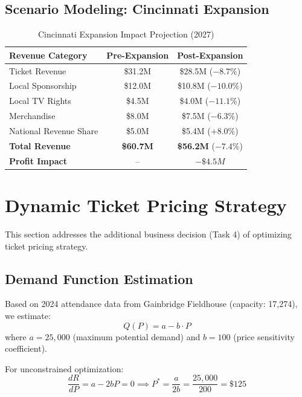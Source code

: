 \documentclass{mcmthesis}
\begin{document}
\subsection{Scenario Modeling: Cincinnati Expansion}

\begin{table}[H]
\centering
\caption{Cincinnati Expansion Impact Projection (2027)}
\begin{tabular}{lcc}
\toprule
\textbf{Revenue Category} & \textbf{Pre-Expansion} & \textbf{Post-Expansion} \\
\midrule
Ticket Revenue & \$31.2M & \$28.5M ($-8.7\%$) \\
Local Sponsorship & \$12.0M & \$10.8M ($-10.0\%$) \\
Local TV Rights & \$4.5M & \$4.0M ($-11.1\%$) \\
Merchandise & \$8.0M & \$7.5M ($-6.3\%$) \\
National Revenue Share & \$5.0M & \$5.4M ($+8.0\%$) \\
\midrule
\textbf{Total Revenue} & \textbf{\$60.7M} & \textbf{\$56.2M} ($-7.4\%$) \\
\textbf{Profit Impact} & -- & \textbf{$-\$4.5M$} \\
\bottomrule
\end{tabular}
\end{table}

\section{Dynamic Ticket Pricing Strategy}

This section addresses the additional business decision (Task 4) of optimizing ticket pricing strategy.

\subsection{Demand Function Estimation}

Based on 2024 attendance data from Gainbridge Fieldhouse (capacity: 17,274), we estimate:
\begin{equation}
Q(P) = a - b \cdot P
\end{equation}
where $a = 25,000$ (maximum potential demand) and $b = 100$ (price sensitivity coefficient).

For unconstrained optimization:
\begin{equation}
\frac{dR}{dP} = a - 2bP = 0 \implies P^* = \frac{a}{2b} = \frac{25,000}{200} = \$125
\end{equation}
\end{document}
